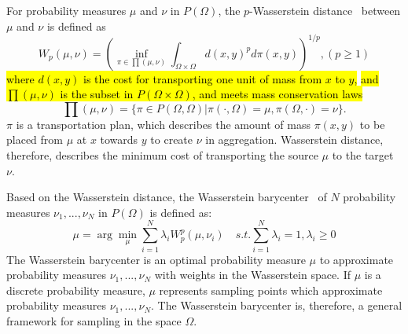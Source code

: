 
For probability measures $\mu$ and $\nu$ in $P(\Omega)$,
the $p$-Wasserstein distance~\cite{villani:2008:optimal} between $\mu$ and $\nu$ is defined as
\begin{equation*}
  W_p(\mu,\nu)=\left(\inf\limits_{\pi\in\prod(\mu,\nu)}\int_{\Omega\times\Omega}d(x,y)^pd\pi(x,y)\right )^{1/p}, (p\geq1)
\end{equation*}
\hl{where $d(x,y)$ is the cost for transporting one unit of mass from $x$ to $y$,}
\hl{and  $\prod(\mu,\nu)$ is the subset in $P(\Omega\times\Omega)$, and meets mass conservation laws}
\begin{equation*}
\prod(\mu,\nu)=\{\pi\in P(\Omega,\Omega)|\pi(\cdot,\Omega)=\mu,\pi(\Omega,\cdot)=\nu\}.
\end{equation*}
$\pi$ is a transportation plan,
which describes the amount of mass $\pi(x,y)$ to be placed from $\mu$ at $x$ towards $y$ to create $\nu$ in aggregation.
Wasserstein distance, therefore, describes the minimum cost of transporting the source $\mu$ to the target $\nu$.


Based on the Wasserstein distance,
the Wasserstein barycenter~\cite{agueh:2011:barycenters,cuturi:2013:fast,BTSSPP:2016:Wasserstein} of $N$ probability measures ${\nu_1,...,\nu_N}$ in $P(\Omega)$ is defined as:
\begin{equation}\label{WB}
    \mu=\arg\min\limits_\mu\sum\limits_{i=1}^N\lambda_iW_p^p(\mu,\nu_i)  \quad
    s.t. \sum\limits_{i=1}^N\lambda_i=1, \lambda_i\geq0
\end{equation}
The Wasserstein barycenter is an optimal probability measure $\mu$ to approximate probability measures ${\nu_1,...,\nu_N}$ with weights in the Wasserstein space.
If $\mu$ is a discrete probability measure,
$\mu$ represents sampling points which approximate probability measures ${\nu_1,...,\nu_N}$.
The Wasserstein barycenter is, therefore, a general framework for sampling in the space $\Omega$.
